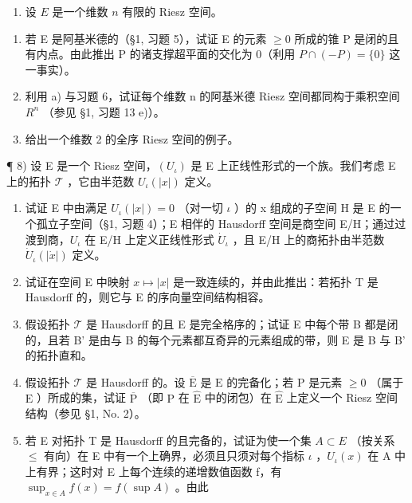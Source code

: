 \begin{enumerate}
\def\labelenumi{\arabic{enumi})}
\setcounter{enumi}{6}
\tightlist
\item
  设 \(E\) 是一个维数 \(n\) 有限的 Riesz 空间。
\end{enumerate}

\begin{enumerate}
\def\labelenumi{\alph{enumi})}
\item
  若 E 是阿基米德的（§1, 习题 5），试证 E 的元素 \(\geqslant 0\) 所成的锥 P 是闭的且有内点。由此推出 P 的诸支撑超平面的交化为 0（利用 \(P \cap (-P) = \{0\}\) 这一事实）。
\item
  利用 a) 与习题 6，试证每个维数 n 的阿基米德 Riesz 空间都同构于乘积空间 \(R^{n}\) （参见 §1, 习题 13 e)）。
\item
  给出一个维数 2 的全序 Riesz 空间的例子。
\end{enumerate}

¶ 8) 设 E 是一个 Riesz 空间，\((U_{\iota})\) 是 E 上正线性形式的一个族。我们考虑 E 上的拓扑 \(\mathcal{T}\) ，它由半范数 \(U_{\iota}(|x|)\) 定义。

\begin{enumerate}
\def\labelenumi{\alph{enumi})}
\item
  试证 E 中由满足 \(U_{\iota}(|x|)=0\) （对一切 \(\iota\) ）的 x 组成的子空间 H 是 E 的一个孤立子空间（§1, 习题 4）；E 相伴的 Hausdorff 空间是商空间 E/H；通过过渡到商，\(U_{\iota}\) 在 E/H 上定义正线性形式 \(\dot{U}_{\iota}\) ，且 E/H 上的商拓扑由半范数 \(\dot{U}_{\iota}(|\dot{x}|)\) 定义。
\item
  试证在空间 E 中映射 \(x \mapsto |x|\) 是一致连续的，并由此推出：若拓扑 T 是 Hausdorff 的，则它与 E 的序向量空间结构相容。
\item
  假设拓扑 \(\mathcal{T}\) 是 Hausdorff 的且 E 是完全格序的；试证 E 中每个带 B 都是闭的，且若 B' 是由与 B 的每个元素都互奇异的元素组成的带，则 E 是 B 与 B' 的拓扑直和。
\item
  假设拓扑 \(\mathcal{T}\) 是 Hausdorff 的。设 \(\overline{\mathrm{E}}\) 是 \(\mathrm{E}\) 的完备化；若 \(\mathrm{P}\) 是元素 \(\geqslant 0\) （属于 \(\mathrm{E}\) ）所成的集，试证 \(\overline{\mathrm{P}}\) （即 \(\mathrm{P}\) 在 \(\widehat{\mathrm{E}}\) 中的闭包）在 \(\widehat{\mathrm{E}}\) 上定义一个 Riesz 空间结构（参见 §1, No. 2）。
\item
  若 E 对拓扑 T 是 Hausdorff 的且完备的，试证为使一个集 \(A \subset E\) （按关系 \(\leqslant\) 有向）在 E 中有一个上确界，必须且只须对每个指标 \(\iota\) ，\(U_{\iota}(x)\) 在 A 中上有界；这时对 E 上每个连续的递增数值函数 f，有 \(\sup_{x \in A} f(x) = f(\sup A)\) 。由此
\end{enumerate}

